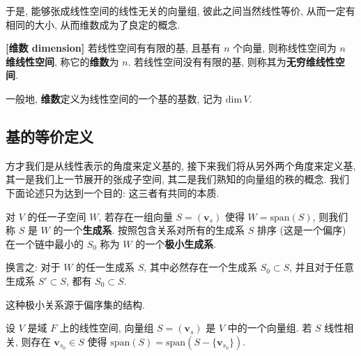 \documentclass[UTF8]{book}
\begin{document}
于是, 能够张成线性空间的线性无关的向量组, 
彼此之间当然线性等价, 从而一定有相同的大小, 
从而维数成为了良定的概念. 

\begin{definition}
    \textbf{[维数 dimension]} 
    若线性空间有有限的基, 且基有 $n$ 个向量, 
    则称线性空间为\textbf{ $n$ 维线性空间}, 
    称它的\textbf{维数}为 $n$. 
    若线性空间没有有限的基, 则称其为\textbf{无穷维线性空间}. 

    一般地, \textbf{维数}定义为线性空间的一个基的基数, 
    记为 $\mathrm{dim}\,V$. 
\end{definition}

\subsection{基的等价定义}

方才我们是从线性表示的角度来定义基的, 
接下来我们将从另外两个角度来定义基, 
其一是我们上一节展开的张成子空间, 
其二是我们熟知的向量组的秩的概念. 
我们下面论述只为达到一个目的: 这三者有共同的本质. 

对 $V$ 的任一子空间 $W$, 
若存在一组向量 $S=(\boldsymbol{v}_s)$ 使得 
$W= \mathrm{span}(S)$, 
则我们称 $S$ 是 $W$ 的一个\textbf{生成系}. 
按照包含关系对所有的生成系 $S$ 排序 (这是一个偏序) 
在一个链中最小的 $S_0$ 称为 $W$ 的一个\textbf{极小生成系}. 

换言之: 对于 $W$ 的任一生成系 $S$, 
其中必然存在一个生成系 $S_0 \subset S$, 
并且对于任意生成系 $S' \subset S$, 都有 $S_0 \subset S$. 

这种极小关系源于偏序集的结构. 

\begin{lemma}
    设 $V$ 是域 $F$ 上的线性空间, 
    向量组 $S=(\boldsymbol{v}_s)$ 是 $V$ 中的一个向量组. 
    若 $S$ 线性相关, 则存在 $\boldsymbol{v}_{s_0} \in S$ 
    使得 $\mathrm{span}(S) =
    \mathrm{span}(S-\{\boldsymbol{v}_{s_0}\})$. 
\end{lemma}
\end{document}
